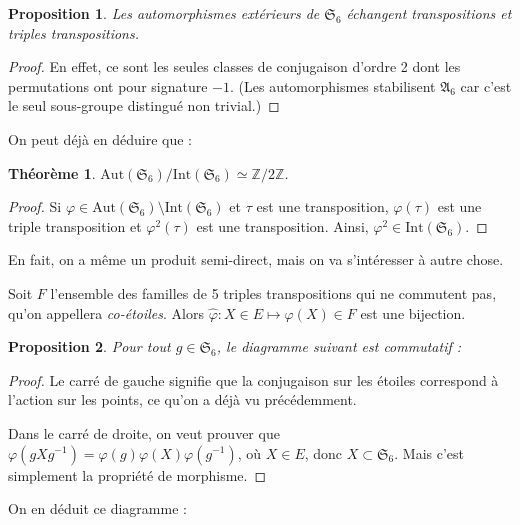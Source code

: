 \documentclass[a4paper, 11pt]{article}
\def\Z{\mathbb{Z}}
\def\Sigmap{\mathfrak{S}}
\def\Aut{\mathrm{Aut}}
\newtheorem*{proposition}{Proposition}
\newtheorem*{theorem}{Théorème}
\begin{document}
\begin{proposition}
  Les automorphismes extérieurs de $\Sigmap_6$ échangent transpositions et
  triples transpositions.
\end{proposition}
\begin{proof}
  En effet, ce sont les seules classes de conjugaison d'ordre 2 dont les
  permutations ont pour signature $-1$. (Les automorphismes stabilisent
  $\mathfrak{A}_6$ car c'est le seul sous-groupe distingué non trivial.)
\end{proof}

On peut déjà en déduire que :

\begin{theorem}
  $\Aut(\Sigmap_6)/\mathrm{Int}(\Sigmap_6) \simeq \Z/2\Z$.
\end{theorem}
\begin{proof}
  Si $\varphi \in \Aut(\Sigmap_6) \setminus \mathrm{Int}(\Sigmap_6)$ et
  $\tau$ est une transposition, $\varphi(\tau)$ est une triple transposition et
  $\varphi^2(\tau)$ est une transposition. Ainsi, $\varphi^2 \in
  \mathrm{Int}(\Sigmap_6)$.
\end{proof}

En fait, on a même un produit semi-direct, mais on va s'intéresser à autre
chose.

Soit $F$ l'ensemble des familles de 5 triples transpositions qui ne commutent
pas, qu'on appellera \emph{co-étoiles}. Alors $\widehat{\varphi} : X \in E \mapsto
\varphi(X) \in F$ est une bijection.

\begin{proposition}
  Pour tout $g \in \Sigmap_6$, le diagramme suivant est commutatif :
  \begin{center}
  \end{center}
\end{proposition}
\begin{proof}
  Le carré de gauche signifie que la conjugaison sur les étoiles correspond à
  l'action sur les points, ce qu'on a déjà vu précédemment.
  
  Dans le carré de droite, on veut prouver que $\varphi(gXg^{-1}) =
  \varphi(g)\varphi(X)\varphi(g^{-1})$, où $X \in E$, donc $X \subset \Sigmap_6$. Mais
  c'est simplement la propriété de morphisme.
\end{proof}
On en déduit ce diagramme :
\end{document}
